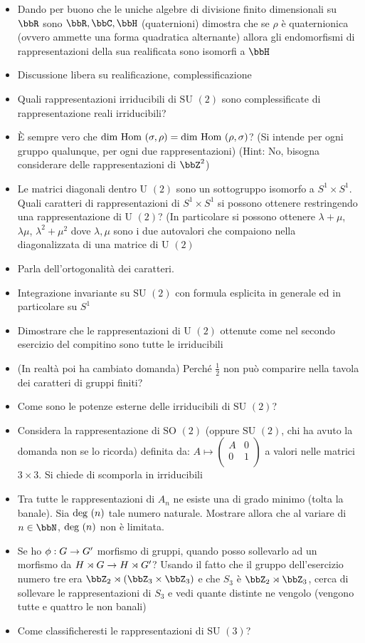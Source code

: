 \documentclass[a4paper,NoNotes,GeneralMath]{stdmdoc}
\newcommand{\SU}{\text{SU }}
\newcommand{\SO}{\text{SO }}
\newcommand{\U}{\text{U }}
\newcommand{\Hom}{\text{Hom }}
\begin{document}
\begin{itemize}
		\item Dando per buono che le uniche algebre di divisione finito dimensionali su $\bbR$ sono $\bbR, \bbC, \bbH$ (quaternioni) dimostra che se $\rho$ è quaternionica (ovvero ammette una forma quadratica alternante) allora gli endomorfismi di rappresentazioni della sua realificata sono isomorfi a $\bbH$
		\item Discussione libera su realificazione, complessificazione
		\item Quali rappresentazioni irriducibili di $\SU(2)$ sono complessificate di rappresentazione reali irriducibili?
		\item È sempre vero che $\Dim \Hom(\sigma, \rho) = \Dim \Hom(\rho, \sigma)$? (Si intende per ogni gruppo qualunque, per ogni due rappresentazioni) (Hint: No, bisogna considerare delle rappresentazioni di $\bbZ^2$)
		\item Le matrici diagonali dentro $\U(2)$ sono un sottogruppo isomorfo a $S^1 \times S^1$. Quali caratteri di rappresentazioni di $S^1 \times S^1$ si possono ottenere restringendo una rappresentazione di $\U(2)$? (In particolare si possono ottenere $\lambda + \mu$, $\lambda\mu$, $\lambda^2 + \mu^2$ dove $\lambda, \mu$ sono i due autovalori che compaiono nella diagonalizzata di una matrice di $\U(2)$
		\item Parla dell'ortogonalità dei caratteri.
		\item Integrazione invariante su $\SU(2)$ con formula esplicita in generale ed in particolare su $S^1$
		\item Dimostrare che le rappresentazioni di $\U(2)$ ottenute come nel secondo esercizio del compitino sono tutte le irriducibili
		\item (In realtà poi ha cambiato domanda) Perché $\frac{1}{2}$ non può comparire nella tavola dei caratteri di gruppi finiti?
		\item Come sono le potenze esterne delle irriducibili di $\SU(2)$?
		\item Considera la rappresentazione di $\SO(2)$ (oppure $\SU(2)$, chi ha avuto la domanda non se lo ricorda) definita da: $A \mapsto \left( \begin{array}{cc} A & 0 \\ 0 & 1 \\ \end{array} \right)$ a valori nelle matrici $3\times 3$. Si chiede di scomporla in irriducibili
		\item Tra tutte le rappresentazioni di $A_n$ ne esiste una di grado minimo (tolta la banale). Sia $\mbox{deg }(n)$ tale numero naturale. Mostrare allora che al variare di $n \in \bbN$, $\mbox{deg }(n)$ non è limitata.
		\item Se ho $\phi: G \rightarrow G'$ morfismo di gruppi, quando posso sollevarlo ad un morfismo da $H \rtimes G \rightarrow H \rtimes G'$? Usando il fatto che il gruppo dell'esercizio numero tre era $\bbZ_2 \rtimes (\bbZ_3 \times \bbZ_3)$ e che $S_3$ è $\bbZ_2 \rtimes \bbZ_3$, cerca di sollevare le rappresentazioni di $S_3$ e vedi quante distinte ne vengolo (vengono tutte e quattro le non banali)
		\item Come classificheresti le rappresentazioni di $\SU(3)$?
	\end{itemize}
\end{document}
